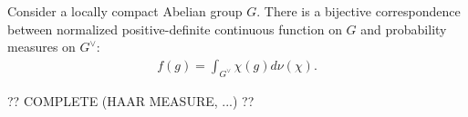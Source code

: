    \begin{theorem}[Bochner]
        Consider a locally compact Abelian group $G$. There is a bijective correspondence between normalized positive-definite continuous function on $G$ and probability measures on $G^\vee$:
        \begin{gather}
            f(g) = \int_{G^\vee}\chi(g)d\nu(\chi).
        \end{gather}
    \end{theorem}

    ?? COMPLETE (HAAR MEASURE, ...) ??